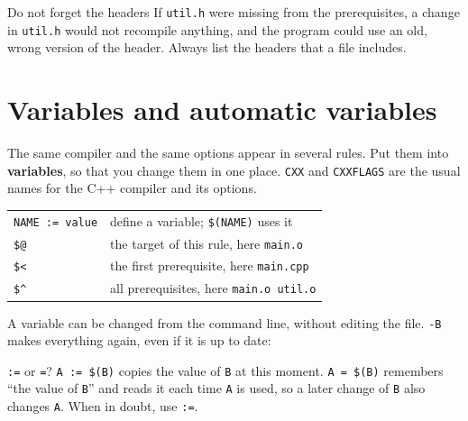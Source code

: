 \documentclass[a4paper,11pt]{article}
\begin{document}
\begin{trap}{Do not forget the headers}
If \texttt{util.h} were missing from the prerequisites, a change in \texttt{util.h} would not recompile anything,
and the program could use an old, wrong version of the header. Always list the headers that a file includes.
\end{trap}

\section{Variables and automatic variables}

The same compiler and the same options appear in several rules. Put them into \textbf{variables}, so that you change
them in one place. \texttt{CXX} and \texttt{CXXFLAGS} are the usual names for the C++ compiler and its options.


\begin{center}
\renewcommand{\arraystretch}{1.2}
\begin{tabularx}{\linewidth}{@{}lX@{}}
\toprule
\texttt{NAME := value} & define a variable; \texttt{\$(NAME)} uses it \\
\texttt{\$@} & the target of this rule, here \texttt{main.o} \\
\texttt{\$<} & the first prerequisite, here \texttt{main.cpp} \\
\texttt{\$\^{}} & all prerequisites, here \texttt{main.o util.o} \\
\bottomrule
\end{tabularx}
\end{center}

A variable can be changed from the command line, without editing the file. \texttt{-B} makes everything again,
even if it is up to date:


\begin{note}{\texttt{:=} or \texttt{=}?}
\texttt{A := \$(B)} copies the value of \texttt{B} at this moment. \texttt{A = \$(B)} remembers ``the value of
\texttt{B}'' and reads it each time \texttt{A} is used, so a later change of \texttt{B} also changes \texttt{A}.
When in doubt, use \texttt{:=}.
\end{note}
\end{document}
